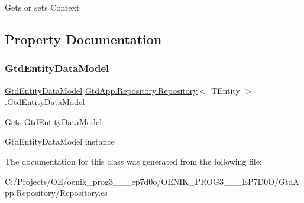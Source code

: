 Gets or sets Context 



\subsection{Property Documentation}
\mbox{\label{class_gtd_app_1_1_repository_1_1_repository_a26a12cb4c9e45c29c377f4ea76a78b68}} 
\subsubsection{\texorpdfstring{Gtd\+Entity\+Data\+Model}{GtdEntityDataModel}}
{\footnotesize\ttfamily \mbox{\hyperlink{class_gtd_app_1_1_data_1_1_gtd_entity_data_model}{Gtd\+Entity\+Data\+Model}} \mbox{\hyperlink{class_gtd_app_1_1_repository_1_1_repository}{Gtd\+App.\+Repository.\+Repository}}$<$ T\+Entity $>$.\mbox{\hyperlink{class_gtd_app_1_1_data_1_1_gtd_entity_data_model}{Gtd\+Entity\+Data\+Model}}\hspace{0.3cm}{\ttfamily [get]}}



Gets Gtd\+Entity\+Data\+Model 

Gtd\+Entity\+Data\+Model instance

The documentation for this class was generated from the following file\+:\begin{DoxyCompactItemize}
\item 
C\+:/\+Projects/\+O\+E/oenik\+\_\+prog3\+\_\+\_\+\_\+ep7d0o/\+O\+E\+N\+I\+K\+\_\+\+P\+R\+O\+G3\+\_\+\_\+\_\+\+E\+P7\+D0\+O/\+Gtd\+App.\+Repository/Repository.\+cs\end{DoxyCompactItemize}
